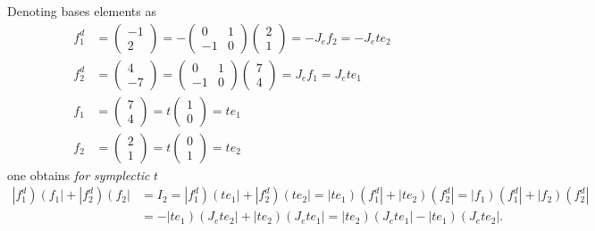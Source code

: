 \documentclass[aps,preprint]{revtex4}
\begin{document}
Denoting bases elements as 
\begin{align}
f_{1}^{d} & =\left( 
\begin{array}{c}
-1 \\ 
2%
\end{array}
\right) =-\left( 
\begin{array}{cc}
0 & 1 \\ 
-1 & 0%
\end{array}
\right) \left( 
\begin{array}{c}
2 \\ 
1%
\end{array}
\right) =-J_{e}f_{2}=-J_{e}te_{2} \\
f_{2}^{d} & =\left( 
\begin{array}{c}
4 \\ 
-7%
\end{array}
\right) =\left( 
\begin{array}{cc}
0 & 1 \\ 
-1 & 0%
\end{array}
\right) \left( 
\begin{array}{c}
7 \\ 
4%
\end{array}
\right) =J_{e}f_{1}=J_{e}te_{1} \\
f_{1} & =\left( 
\begin{array}{c}
7 \\ 
4%
\end{array}
\right) =t\left( 
\begin{array}{c}
1 \\ 
0%
\end{array}
\right) =te_{1} \\
f_{2} & =\left( 
\begin{array}{c}
2 \\ 
1%
\end{array}
\right) =t\left( 
\begin{array}{c}
0 \\ 
1%
\end{array}
\right) =te_{2}
\end{align}
one obtains \emph{for symplectic} $t$ 
\begin{align}
\left\vert f_{1}^{d}\right) \left( f_{1}\right\vert +\left\vert
f_{2}^{d}\right) \left( f_{2}\right\vert & =I_{2}=\left\vert
f_{1}^{d}\right) \left( te_{1}\right\vert +\left\vert f_{2}^{d}\right)
\left( te_{2}\right\vert =\left\vert te_{1}\right) \left(
f_{1}^{d}\right\vert +\left\vert te_{2}\right) \left( f_{2}^{d}\right\vert
=\left\vert f_{1}\right) \left( f_{1}^{d}\right\vert +\left\vert
f_{2}\right) \left( f_{2}^{d}\right\vert \\
& =-\left\vert te_{1}\right) \left( J_{e}te_{2}\right\vert +\left\vert
te_{2}\right) \left( J_{e}te_{1}\right\vert =\left\vert te_{2}\right) \left(
J_{e}te_{1}\right\vert -\left\vert te_{1}\right) \left(
J_{e}te_{2}\right\vert .
\end{align}
\end{document}

